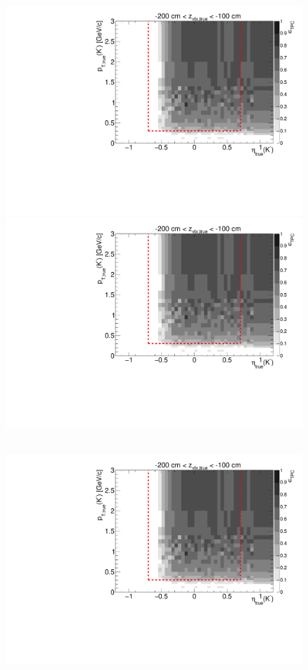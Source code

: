 \begin{figure}[hb]
{  \includegraphics[width=\linewidth,page=7]{graphics/eff/Eff2D_TPC_kaon_Minus.pdf}\\
  \includegraphics[width=\linewidth,page=9]{graphics/eff/Eff2D_TPC_kaon_Minus.pdf}
}~
\parbox{0.495\textwidth}{
  \centering
  \includegraphics[width=\linewidth,page=4]{graphics/eff/Eff2D_TPC_kaon_Minus.pdf}\\
}
\end{figure}
